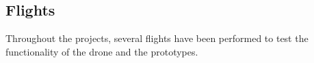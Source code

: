 \newpage
\subsection{Flights}
Throughout the projects, several flights have been performed to test the functionality of the drone and the prototypes.



